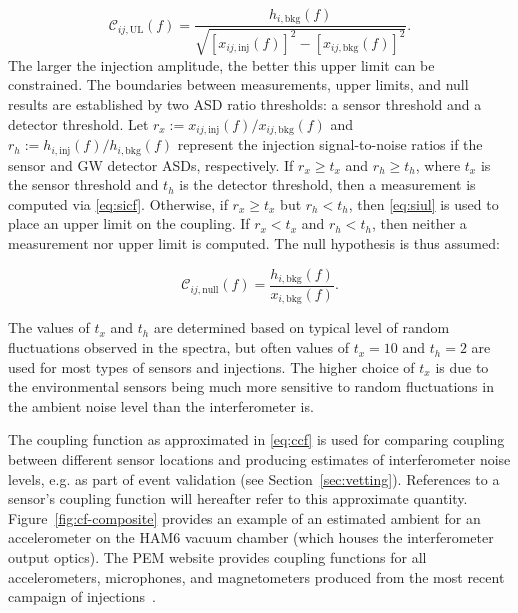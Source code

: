 \begin{equation}\label{eq:siul}
	\mathcal{C}_{ij, \mathrm{UL}}(f) = \frac{h_{i,\textrm{bkg}}(f)}{\sqrt{[x_{ij,\textrm{inj}}(f)]^2 - [x_{ij,\textrm{bkg}}(f)]^2}}.
\end{equation}
The larger the injection amplitude, the better this upper limit can be constrained.
The boundaries between measurements, upper limits, and null results are established by two \ac{ASD} ratio thresholds: a sensor threshold and a detector threshold.
Let $r_x := x_{ij,\textrm{inj}}(f) / x_{ij,\textrm{bkg}}(f)$ and $r_h := h_{i,\textrm{inj}}(f) / h_{i,\textrm{bkg}}(f)$ represent the injection signal-to-noise ratios if the sensor and \ac{GW} detector \acp{ASD}, respectively.
If $r_x \geq t_x$ and $r_h \geq t_h$, where $t_x$ is the sensor threshold and $t_h$ is the detector threshold, then a measurement is computed via \cref{eq:sicf}.
Otherwise, if $r_x \geq t_x$ but $r_h < t_h$, then \cref{eq:siul} is used to place an upper limit on the coupling.
If $r_x < t_x$ and $r_h < t_h$, then neither a measurement nor upper limit is computed.
The null hypothesis is thus assumed:

\begin{equation}\label{eq:sinull}
	\mathcal{C}_{ij, \mathrm{null}}(f) = \frac{h_{i,\textrm{bkg}}(f)}{x_{i,\textrm{bkg}}(f)}.
\end{equation}

The values of $t_x$ and $t_h$ are determined based on typical level of random fluctuations observed in the spectra, but often values of $t_x = 10$ and $t_h = 2$ are used for most types of sensors and injections.
The higher choice of $t_x$ is due to the environmental sensors being much more sensitive to random fluctuations in the ambient noise level than the interferometer is.

The coupling function as approximated in \cref{eq:ccf} is used for comparing coupling between different sensor locations and producing estimates of interferometer noise levels, e.g. as part of event validation (see Section~\ref{sec:vetting}).
References to a sensor's coupling function will hereafter refer to this approximate quantity.
Figure~\ref{fig:cf-composite} provides an example of an estimated ambient for an accelerometer on the HAM6 vacuum chamber (which houses the interferometer output optics).
The \ac{PEM} website provides coupling functions for all accelerometers, microphones, and magnetometers produced from the most recent campaign of injections~\citep{PEM_website}.

